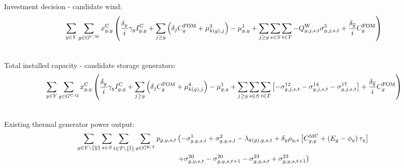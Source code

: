 \documentclass{article}
\begin{document}
Investment decision - candidate wind:
\begin{align}
& \sum\limits_{\iYear \in \sYears} \sum\limits_{\iGenerator \in \sGeneratorsCandidateWind} \vInstalledCapacity \left(\frac{\cDiscountRate}{\cInterestRate} \cAmortisationRate \cCandidateInvestmentCost + \sum\limits_{\iYearAlias \geq \iYear} \left(\cDiscountRate[\iYearAlias] \cFixedOperationsMaintenanceCostGenerator + \dWindBuildLimit[k(\iGenerator), \iYearAlias] \right) - \dNonNegativeCandidateCapacity 
+ \sum\limits_{\iYearAlias \geq \iYear} \sum\limits_{\iScenario \in \sScenarios} \sum\limits_{\iInterval \in \sIntervals} - \cCapacityFactorWind[\iGenerator,\iYearAlias,\iScenario,\iInterval] \dMaxPowerOutputWindCandidate[\iGenerator,\iYearAlias,\iScenario,\iInterval] + \frac{\cDiscountRate[\iYearTerminal]}{\cInterestRate}\cFixedOperationsMaintenanceCostGenerator \right)\\\nonumber
\end{align}

Total installed capacity - candidate storage generators:
\begin{align}
& \sum\limits_{\iYear \in \sYears} \sum\limits_{\iGenerator \in \sStorageCandidate} \vInstalledCapacity \left(\frac{\cDiscountRate}{\cInterestRate} \cAmortisationRate \cCandidateInvestmentCost + \sum\limits_{\iYearAlias \geq \iYear}\left(\cDiscountRate[\iYearAlias] \cFixedOperationsMaintenanceCostGenerator + \dStorageBuildLimit[k(\iGenerator),\iYearAlias] \right) - \dNonNegativeCandidateCapacity + \sum\limits_{\iYearAlias \geq \iYear} \sum\limits_{\iScenario \in \sScenarios} \sum\limits_{\iInterval \in \sIntervals} \left[- \dMaxChargingRateCandidate[\iGenerator,\iYearAlias,\iScenario,\iInterval] - \dMaxDischargingRateCandidate[\iGenerator,\iYearAlias,\iScenario,\iInterval] - \dMaxStorageEnergyCandidate[\iGenerator,\iYearAlias,\iScenario,\iInterval] \right] + \frac{\cDiscountRate[\iYearTerminal]}{\cInterestRate}\cFixedOperationsMaintenanceCostGenerator\right)\\\nonumber
\end{align}

Existing thermal generator power output:
\begin{align}
	\sum\limits_{\iYear \in \sYears 
		\setminus \{\iYearTerminal\}
	}\sum\limits_{\iScenario \in \sScenarios}\sum\limits_{\iInterval \in \sIntervals \setminus \{\iIntervalTerminal\}} \sum\limits_{\iGenerator \in \sGeneratorsExistingThermal} \vPower &\left( -\dMinPowerOutput + \dMaxPowerOutputExistingThermal 
	- \dPowerBalance[k(\iGenerator),\iYear,\iScenario,\iInterval] + \cDiscountRate \cScenarioDuration \left[\cMarginalCost + \left(\cEmissionsIntensity - \vBaseline\right)\vPermitPrice \right] \right. \nonumber\\
	& \left. + \dRampRateUp - \dRampRateUp[\iGenerator,\iYear,\iScenario,\iInterval + 1] - \dRampRateDown + \dRampRateDown[\iGenerator,\iYear,\iScenario,\iInterval + 1]
	\right)\\\nonumber
\end{align}
\end{document}
